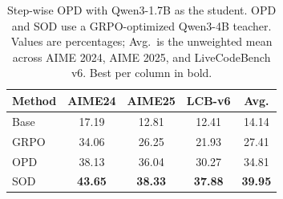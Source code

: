\begin{table}[t]
    \centering
    \small
    \setlength{\tabcolsep}{7pt}
    \renewcommand{\arraystretch}{1.15}
    \caption{
    Step-wise OPD with Qwen3-1.7B as the student. OPD and SOD use a GRPO-optimized Qwen3-4B teacher. Values are percentages; Avg.\ is the unweighted mean across AIME 2024, AIME 2025, and LiveCodeBench v6. Best per column in bold.
    }
    \label{tab:stepwise_opd_results}
    \begin{tabular}{lcccc}
        \toprule
        Method
        & AIME24
        & AIME25
        & LCB-v6
        & Avg. \\
        \midrule
        Base
        & 17.19
        & 12.81
        & 12.41
        & 14.14 \\

        \midrule
        
        GRPO
        & 34.06
        & 26.25
        & 21.93
        & 27.41 \\

        OPD
        & 38.13
        & 36.04
        & 30.27
        & 34.81 \\

        SOD
        & \textbf{43.65}
        & \textbf{38.33}
        & \textbf{37.88}
        & \textbf{39.95} \\
        \bottomrule
    \end{tabular}
\end{table}
